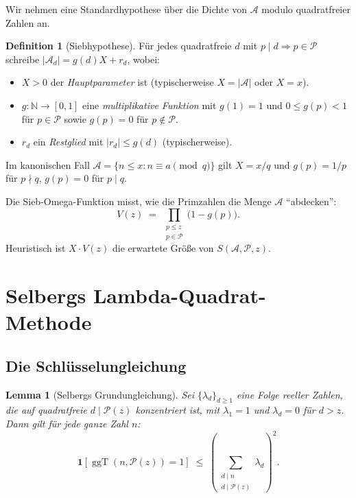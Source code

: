 \documentclass[12pt,a4paper]{amsart}
\newtheorem{lemma}[theorem]{Lemma}
\theoremstyle{definition}
\newtheorem{definition}[theorem]{Definition}
\newcommand{\N}{\mathbb{N}}
\DeclareMathOperator{\ggT}{ggT}
\begin{document}
Wir nehmen eine Standardhypothese über die Dichte von $\mathcal{A}$ modulo
quadratfreier Zahlen an.

\begin{definition}[Siebhypothese]\label{def:hypothese}
  Für jedes quadratfreie $d$ mit $p \mid d \Rightarrow p \in \mathcal{P}$
  schreibe $|\mathcal{A}_d| = g(d) X + r_d$, wobei:
  \begin{itemize}
    \item $X > 0$ der \emph{Hauptparameter} ist (typischerweise $X = |\mathcal{A}|$
      oder $X = x$).
    \item $g : \N \to [0, 1]$ eine \emph{multiplikative Funktion} mit
      $g(1) = 1$ und $0 \leq g(p) < 1$ für $p \in \mathcal{P}$ sowie
      $g(p) = 0$ für $p \notin \mathcal{P}$.
    \item $r_d$ ein \emph{Restglied} mit $|r_d| \leq g(d)$ (typischerweise).
  \end{itemize}
  Im kanonischen Fall $\mathcal{A} = \{n \leq x : n \equiv a \pmod q\}$
  gilt $X = x/q$ und $g(p) = 1/p$ für $p \nmid q$, $g(p) = 0$ für $p \mid q$.
\end{definition}

Die Sieb-Omega-Funktion misst, wie die Primzahlen die Menge $\mathcal{A}$ ``abdecken'':
\begin{equation}\label{eq:omega}
  V(z) \;=\; \prod_{\substack{p \leq z \\ p \in \mathcal{P}}} \bigl(1 - g(p)\bigr).
\end{equation}
Heuristisch ist $X \cdot V(z)$ die erwartete Größe von $S(\mathcal{A},\mathcal{P},z)$.

\section{Selbergs Lambda-Quadrat-Methode}
\label{sec:selberg}

\subsection{Die Schlüsselungleichung}

\begin{lemma}[Selbergs Grundungleichung]\label{lem:selberg_schluessel}
  Sei $\{\lambda_d\}_{d \geq 1}$ eine Folge reeller Zahlen, die auf quadratfreie
  $d \mid \mathcal{P}(z)$ konzentriert ist, mit $\lambda_1 = 1$ und
  $\lambda_d = 0$ für $d > z$.  Dann gilt für jede ganze Zahl $n$:
  \[
    \mathbf{1}[\ggT(n, \mathcal{P}(z)) = 1]
    \;\leq\; \left(\sum_{\substack{d \mid n \\ d \mid \mathcal{P}(z)}} \lambda_d\right)^2.
  \]
\end{lemma}
\end{document}
